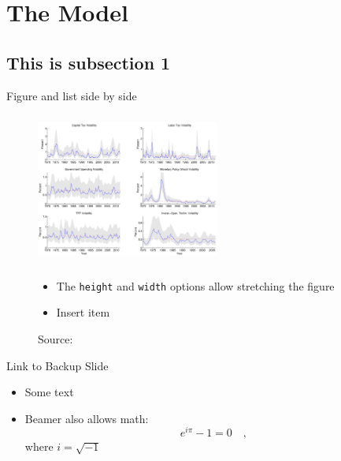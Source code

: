 \documentclass{beamer}
\begin{document}
\section{The Model}
\subsection{This is subsection 1}

\begin{frame}{Figure and list side by side}
    \begin{figure}[htbp!]
        \begin{minipage}{0.55\linewidth}
            \includegraphics[height=5cm,width=6cm]{smoothedvariances}
            \caption{Source:  \textcite{BornPfeifer2014JME}}
        \end{minipage}
        \begin{minipage}{0.4\linewidth}
            \begin{itemize}
            \item The \texttt{height} and \texttt{width} options allow stretching the figure
            \item Insert item
            \end{itemize}
        \end{minipage}
    \end{figure}
\end{frame}


\begin{frame}{Link to Backup Slide}\label{modelstructure} %
        \begin{itemize}
            \item Some text
            \item Beamer also allows math:
            \begin{equation}
                e^{i\pi}-1=0 \quad ,
            \end{equation}
            where $i=\sqrt{-1}$
        \end{itemize}
\hyperlink{model_appendix}{} %
\end{frame}
\end{document}
